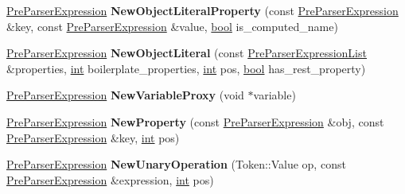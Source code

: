 \begin{DoxyCompactItemize}
\item 
\mbox{\label{classv8_1_1internal_1_1PreParserFactory_ab386b3d66827d08a7766a5139664302c}} 
\mbox{\hyperlink{classv8_1_1internal_1_1PreParserExpression}{Pre\+Parser\+Expression}} {\bfseries New\+Object\+Literal\+Property} (const \mbox{\hyperlink{classv8_1_1internal_1_1PreParserExpression}{Pre\+Parser\+Expression}} \&key, const \mbox{\hyperlink{classv8_1_1internal_1_1PreParserExpression}{Pre\+Parser\+Expression}} \&value, \mbox{\hyperlink{classbool}{bool}} is\+\_\+computed\+\_\+name)
\item 
\mbox{\label{classv8_1_1internal_1_1PreParserFactory_a0b9055dc3df40b086f66e83a573e5500}} 
\mbox{\hyperlink{classv8_1_1internal_1_1PreParserExpression}{Pre\+Parser\+Expression}} {\bfseries New\+Object\+Literal} (const \mbox{\hyperlink{classv8_1_1internal_1_1PreParserExpressionList}{Pre\+Parser\+Expression\+List}} \&properties, \mbox{\hyperlink{classint}{int}} boilerplate\+\_\+properties, \mbox{\hyperlink{classint}{int}} pos, \mbox{\hyperlink{classbool}{bool}} has\+\_\+rest\+\_\+property)
\item 
\mbox{\label{classv8_1_1internal_1_1PreParserFactory_a5f4355f77f1a41bcb6b55fa0e98bec08}} 
\mbox{\hyperlink{classv8_1_1internal_1_1PreParserExpression}{Pre\+Parser\+Expression}} {\bfseries New\+Variable\+Proxy} (void $\ast$variable)
\item 
\mbox{\label{classv8_1_1internal_1_1PreParserFactory_a47b335d563baa61afbb707b0cb4c8cdd}} 
\mbox{\hyperlink{classv8_1_1internal_1_1PreParserExpression}{Pre\+Parser\+Expression}} {\bfseries New\+Property} (const \mbox{\hyperlink{classv8_1_1internal_1_1PreParserExpression}{Pre\+Parser\+Expression}} \&obj, const \mbox{\hyperlink{classv8_1_1internal_1_1PreParserExpression}{Pre\+Parser\+Expression}} \&key, \mbox{\hyperlink{classint}{int}} pos)
\item 
\mbox{\label{classv8_1_1internal_1_1PreParserFactory_acb667d079ebed2002b16b6605e3bc131}} 
\mbox{\hyperlink{classv8_1_1internal_1_1PreParserExpression}{Pre\+Parser\+Expression}} {\bfseries New\+Unary\+Operation} (Token\+::\+Value op, const \mbox{\hyperlink{classv8_1_1internal_1_1PreParserExpression}{Pre\+Parser\+Expression}} \&expression, \mbox{\hyperlink{classint}{int}} pos)

\end{DoxyCompactItemize}
